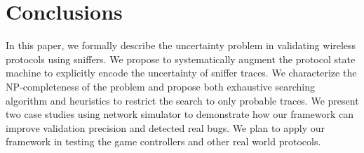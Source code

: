 \section{Conclusions}
\label{sec:conclusion}

In this paper, we formally describe the uncertainty problem in validating
wireless protocols using sniffers. We propose to systematically augment the
protocol state machine to explicitly encode the uncertainty of sniffer traces.
We characterize the NP-completeness of the problem and propose both exhaustive
searching algorithm and heuristics to restrict the search to only probable
traces. We present two case studies using \ns{} network simulator to demonstrate
how our framework can improve validation precision and detected real bugs. We
plan to apply our framework in testing the game controllers and other real world
protocols.

\begin{comment}
Finally, we discuss a few challenges and future
directions.

\textbf{Verification Coverage.} Given a single sniffer trace, it is possible
that not all the states in the state machine are visited during the verification
process. For instance, a rate control state machine based on certain consecutive
packet losses patterns can not be verified if no such consecutive losses appear
in the sniffer trace. In general, given a protocol state machine, how to extract
the packet patterns for each state to be reached and how to alter the testing
such that such patterns can be observed?

\textbf{State Machine Generation.} We manually translated the protocols studied
in this paper into monitor state machines based on the source code, comments and
documentation. The process is time-consuming and error-prone. A more scalable
approach would be taking the protocol specification written in certain formal
language, and automatically translate such specification into state machines
that can be used for verification process.

\end{comment}
